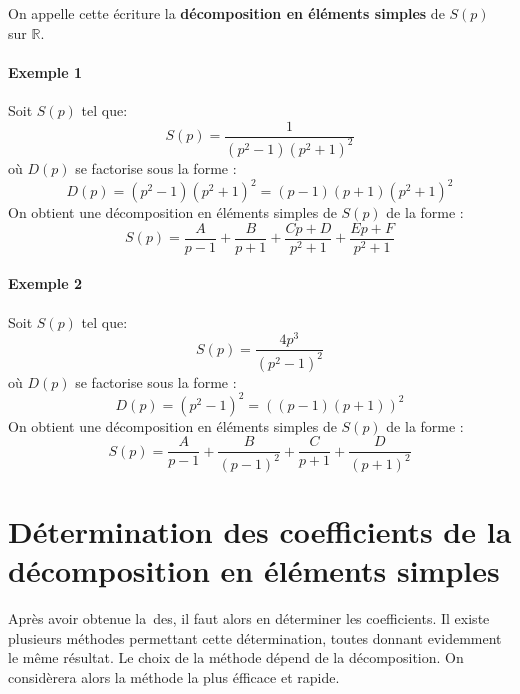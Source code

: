 On appelle cette écriture la \textbf{décomposition en éléments simples} de 
$S(p)$ sur $\mathbb{R}$.

\paragraph{Exemple 1}
Soit $S(p)$ tel que:
$$
S(p)=\dfrac{1}{(p^2-1)(p^2+1)^2}
$$
où $D(p)$ se factorise sous la forme :
$$
D(p)=(p^2-1)(p^2+1)^2=(p-1)(p+1)(p^2+1)^2
$$
On obtient une décomposition en éléments simples de $S(p)$ de la forme :
$$
S(p)=\dfrac{A}{p-1}+\dfrac{B}{p+1}+\dfrac{Cp+D}{p^2+1}+\dfrac{Ep+F}{p^2+1}
$$

\paragraph{Exemple 2}
Soit $S(p)$ tel que:
$$
S(p)=\dfrac{4p^3}{(p^2-1)^2}
$$
où $D(p)$ se factorise sous la forme :
$$
D(p)=(p^2-1)^2=\left((p-1)(p+1)\right)^2
$$
On obtient une décomposition en éléments simples de $S(p)$ de la forme :
$$
S(p)=\dfrac{A}{p-1}+\dfrac{B}{(p-1)^2}+\dfrac{C}{p+1}+\dfrac{D}{(p+1)^2}
$$
\section[Détermination des coefficients de la DES]
        {Détermination des coefficients de la 
         décomposition en éléments simples}
Après avoir obtenue la~\gls{des}, il faut alors en déterminer les coefficients.
Il existe plusieurs méthodes permettant cette détermination, toutes donnant 
evidemment le même résultat. Le choix de la méthode dépend de la décomposition.
On considèrera alors la méthode la plus éfficace et rapide.

